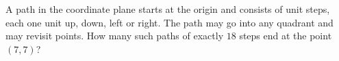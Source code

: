A path in the coordinate plane starts at the origin and consists of unit steps, each one unit up, down, left or right. The path may go into any quadrant and may revisit points. How many such paths of exactly $18$ steps end at the point $(7,7)$?
